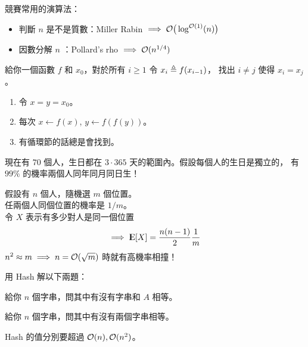 \documentclass[standalone]{beamer}
\begin{document}
\begin{frame}{{\secname}}
  競賽常用的演算法：\pause
  \begin{itemize}
    \item 判斷 $n$ 是不是質數：Miller Rabin $ \implies \mathcal{O}\big(\log^{\mathcal{O}(1)}(n)\big)$
    \item 因數分解 $n$ ：Pollard's rho $ \implies \mathcal{O}(n^{1/4})$
  \end{itemize}
\end{frame}

\begin{frame}{}
  \begin{problem}[找循環節]
    給你一個函數 $f$ 和 $x_0$，對於所有 $i \geq 1$ 令 $x_i \triangleq f(x_{i-1})$，
    找出 $i \neq j$ 使得 $x_i = x_j$。
  \end{problem}
  \pause

  \begin{enumerate}[<+->]
    \item 令 $x = y = x_0$。
    \item 每次 $x \gets f(x)$, $y \gets f(f(y))$。
    \item 有循環節的話總是會找到。
  \end{enumerate}
\end{frame}

\begin{frame}{}
  現在有 $70$ 個人，生日都在 $3 \cdot 365$ 天的範圍內。假設每個人的生日是獨立的，
  有 $99\%$ 的機率兩個人同年同月同日生！ \pause

  假設有 $n$ 個人，隨機選 $m$ 個位置。\\ \pause
  任兩個人同個位置的機率是 $1 / m$。 \\ \pause
  令 $X$ 表示有多少對人是同一個位置
  \[ \implies {\rm I\kern-.3em E}[X] = \frac{n(n-1)}{2} \frac{1}{m} \]
  \pause
  $n^2 \approx m \implies n = \mathcal{O}(\sqrt{m})$ 時就有高機率相撞！
\end{frame}

\begin{frame}{}
  用 Hash 解以下兩題：
  \begin{problem}
    給你 $n$ 個字串，問其中有沒有字串和 $A$ 相等。
  \end{problem}
  \pause
  \begin{problem}
    給你 $n$ 個字串，問其中有沒有兩個字串相等。
  \end{problem}
  \pause
  Hash 的值分別要超過 $\mathcal{O}(n), \mathcal{O}(n^2)$。
\end{frame}
\end{document}

